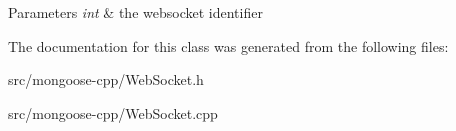 \begin{DoxyParams}{Parameters}
{\em int} & the websocket identifier \\
\hline
\end{DoxyParams}


The documentation for this class was generated from the following files\+:\begin{DoxyCompactItemize}
\item 
src/mongoose-\/cpp/Web\+Socket.\+h\item 
src/mongoose-\/cpp/Web\+Socket.\+cpp\end{DoxyCompactItemize}
